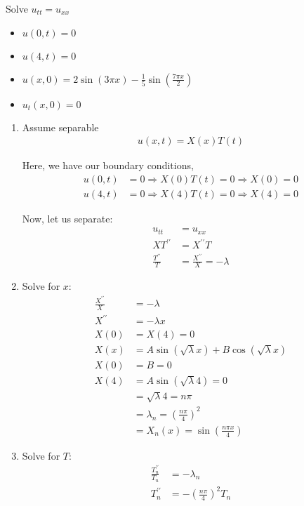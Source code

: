\ex Solve $u_{tt} = u_{xx}$
\begin{itemize}
  \item $u(0, t)   = 0 $
  \item $u(4, t)   = 0 $
  \item $u(x, 0)   = 2 \sin(3 \pi x)
  - \frac{1}{5} \sin\left( \frac{7 \pi x}{2} \right)$
  \item $u_t(x, 0) = 0$
\end{itemize}
%
\begin{enumerate}
  \item Assume separable
  \begin{align}
    u(x, t) = X(x)T(t)
  \end{align}

  Here, we have our boundary conditions,
  \begin{align}
    u(0, t) & = 0 \Rightarrow X(0)T(t) = 0 \Rightarrow X(0) = 0\\
    u(4, t) & = 0 \Rightarrow X(4)T(t) = 0 \Rightarrow X(4) = 0
  \end{align}

  Now, let us separate:
  \begin{align}
    u_{tt} & = u_{xx}\\
    XT^{\prime\prime} & = X^{\prime\prime}T\\
    \frac{T^{\prime\prime}}{T} & = \frac{X^{\prime\prime}}{X} = -\lambda
  \end{align}

  \item Solve for $x$:
  \begin{align}
    \frac{X^{\prime\prime}}{X} & = - \lambda\\
    X^{\prime\prime} & = -\lambda x\\
    X(0) & = X(4) = 0\\
    X(x) & = A \sin(\sqrt \lambda x) + B \cos (\sqrt \lambda x)\\
    X(0) & = B = 0\\
    X(4) & = A \sin(\sqrt \lambda 4) = 0\\
    & = \sqrt \lambda 4 = n \pi\\
    & = \lambda_n = \left( \frac{n \pi}{4} \right)^2\\
    & = X_n(x) = \sin\left( \frac{n \pi x}{4}\right)
  \end{align}

  \item Solve for $T$:
  \begin{align}
    \frac{T^{\prime\prime}_n}{T_n} & = - \lambda_n\\
    T^{\prime\prime}_n & = - \left( \frac{n \pi}{4} \right)^2 T_n
  \end{align}


\end{enumerate}
